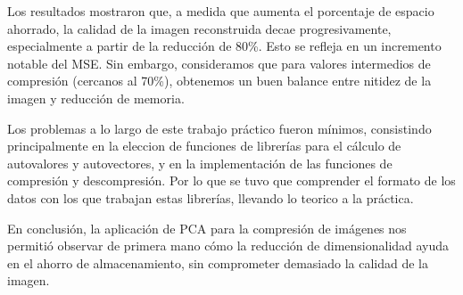 \documentclass[a4paper,12pt]{article}
\begin{document}
Los resultados mostraron que, a medida que aumenta el porcentaje de espacio ahorrado, la calidad
de la imagen reconstruida decae progresivamente, especialmente a partir de la reducción de 80\%. 
Esto se refleja en un incremento notable del MSE. Sin embargo, consideramos que
para valores intermedios de compresión (cercanos al 70\%), obtenemos un buen balance entre nitidez 
de la imagen y reducción de memoria. 

\vspace{1em}

Los problemas a lo largo de este trabajo práctico fueron mínimos, consistindo principalmente en la eleccion de funciones de librerías para el cálculo de autovalores y autovectores, y en la implementación de las funciones de compresión y descompresión. Por lo que se tuvo que comprender el formato de los datos con los que trabajan estas librerías, llevando lo teorico a la práctica.

\vspace{1em}

En conclusión, la aplicación de PCA para la compresión de imágenes nos permitió observar
de primera mano cómo la reducción de dimensionalidad ayuda en el ahorro de almacenamiento,
sin comprometer demasiado la calidad de la imagen.
\end{document}
